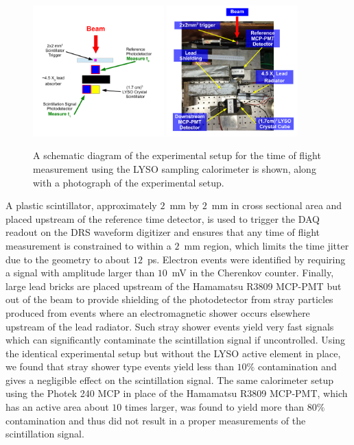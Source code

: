 \documentclass[12pt]{article}
\begin{document}
\begin{figure}[h] \centering
\includegraphics[width=0.45\textwidth]{figs/LYSOSamplingCaloSetupSchematic} 
\includegraphics[width=0.45\textwidth]{figs/LYSOSamplingCaloSetupPhoto} 
\caption{ A schematic diagram of the experimental setup for the
time of flight measurement using the LYSO sampling calorimeter
is shown, along with a photograph of the experimental setup. } 
\label{fig:LYSOSamplingCaloSetup}
\end{figure}

A plastic scintillator, approximately $2$~mm by $2$~mm in cross sectional area
and placed upstream of the reference time detector, is used to trigger
the DAQ readout on the DRS waveform digitizer and ensures that any
time of flight measurement is constrained to within a $2$~mm region,
which limits the time jitter due to the geometry to about $12$~ps. 
Electron events were identified by requiring a signal with amplitude
larger than $10$~mV in the Cherenkov counter.
Finally, large lead bricks are placed upstream of the Hamamatsu
R3809 MCP-PMT but out of the beam to provide shielding of the photodetector
from stray particles produced from events where an electromagnetic shower
occurs elsewhere upstream of the lead radiator. Such stray shower
events yield very fast signals which can significantly contaminate the
scintillation signal if uncontrolled. Using the identical
experimental setup but without the LYSO active element in place,
we found that stray shower type events yield less than $10\%$ contamination
and gives a negligible effect on the scintillation signal. The same calorimeter
setup using the Photek 240 MCP in place of the Hamamatsu R3809 MCP-PMT,
which has an active area about $10$ times larger, was found to yield 
more than $80\%$ contamination and thus did not result in a proper
measurements of the scintillation signal.
\end{document}
